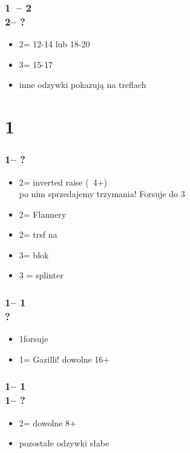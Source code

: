 \documentclass[12pt, a4paper]{report}
\begin{document}
{{{            \subsubsection*{1\clubs\ -- 2\clubs \\
                            2\diams -- ?}
            \begin{itemize}
                \item 2\nt = 12-14 lub 18-20 \bal
                \item 3\nt = 15-17 \bal
                \item inne odzywki pokazują \gf na treflach
            \end{itemize}
        }

        \section*{\colorbox{blue!30}{1\diams}}
         { 
            \subsubsection*{1\diams -- ?}
            \begin{itemize}
                \item 2\diams = inverted raise (\invp\ 4+\diams)\\
                    po nim sprzedajemy trzymania! Forsuje do 3\diams
                \item 2\hearts = Flannery
                \item 2\spades = trsf na \nt
                \item 3\diams = blok
                \item 3 = splinter
            \end{itemize}

            \subsubsection*{1\diams -- 1\major \\
                            ?}
            \begin{itemize}
                \item 1\spades forsuje
                \item 1\nt = Gazilli! dowolne 16+
            \end{itemize}

            \subsubsection*{1\diams -- 1\major \\
                            1\nt -- ?}
            \begin{itemize}
                \item 2\clubs = dowolne 8+ \gf
                \item pozostałe odzywki słabe \nf
            \end{itemize}

}}}
\end{document}
